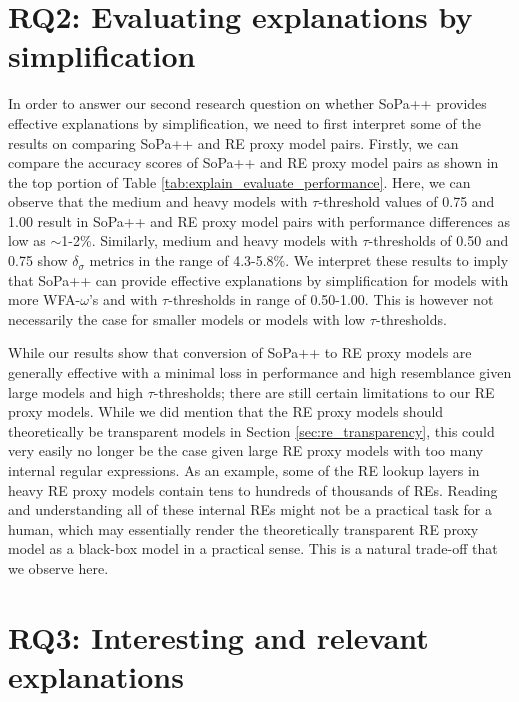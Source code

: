 \section{RQ2: Evaluating explanations by simplification}

In order to answer our second research question on whether SoPa++ provides
effective explanations by simplification, we need to first interpret some of the
results on comparing SoPa++ and RE proxy model pairs. Firstly, we can compare
the accuracy scores of SoPa++ and RE proxy model pairs as shown in the top
portion of Table \ref{tab:explain_evaluate_performance}. Here, we can observe
that the medium and heavy models with $\tau$-threshold values of 0.75 and 1.00
result in SoPa++ and RE proxy model pairs with performance differences as low as
$\sim$1-2$\%$. Similarly, medium and heavy models with $\tau$-thresholds of
0.50 and 0.75 show $\delta_{\sigma}$ metrics in the range of 4.3-5.8$\%$. We
interpret these results to imply that SoPa++ can provide effective explanations
by simplification for models with more WFA-$\omega$'s and with $\tau$-thresholds
in range of 0.50-1.00. This is however not necessarily the case for smaller
models or models with low $\tau$-thresholds.

While our results show that conversion of SoPa++ to RE proxy models are
generally effective with a minimal loss in performance and high resemblance
given large models and high $\tau$-thresholds; there are still certain
limitations to our RE proxy models. While we did mention that the RE proxy
models should theoretically be transparent models in Section
\ref{sec:re_transparency}, this could very easily no longer be the case given
large RE proxy models with too many internal regular expressions. As an example,
some of the RE lookup layers in heavy RE proxy models contain tens to hundreds
of thousands of REs. Reading and understanding all of these internal REs might
not be a practical task for a human, which may essentially render the
theoretically transparent RE proxy model as a black-box model in a practical
sense. This is a natural trade-off that we observe here.

\section{RQ3: Interesting and relevant explanations}

\label{section:discussion_regex}

